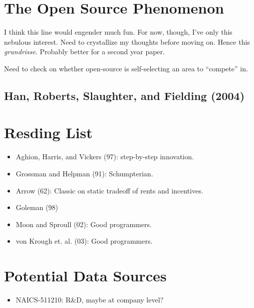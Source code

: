 \documentclass[11pt]{article}
\begin{document}
\section{The Open Source Phenomenon}
\label{sec:the_open_source_phenomenon}

I think this line would engender much fun.  For now, though, I've only this nebulous interest.  Need to crystallize my thoughts before moving on.  Hence this \emph{grundrisse}.  Probably better for a second year paper.

Need to check on whether open-source is self-selecting an area to ``compete'' in.

\subsection{Han, Roberts, Slaughter, and Fielding (2004)}
\label{sub:han_roberts_slaughter_and_fielding_}

  

\section{Resding List}
\label{sec:resding_list}

\begin{itemize}
    \item Aghion, Harris, and Vickers (97): step-by-step innovation.
    \item Grossman and Helpman (91): Schumpterian.
    \item Arrow (62): Classic on static tradeoff of rents and incentives.
    \item Goleman (98)
    \item Moon and Sproull (02): Good programmers.
    \item von Krough et. al. (03): Good programmers.
\end{itemize}

\section{Potential Data Sources}
\label{sec:potential_data_sources}

\begin{itemize}
    \item NAICS-511210: R\&D, maybe at company level?
\end{itemize}
\end{document}

